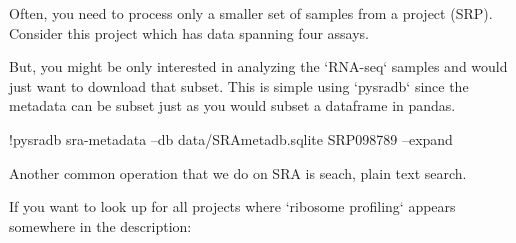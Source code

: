 \documentclass[9pt,a4paper]{extarticle}
\newenvironment{allintypewriter}{\ttfamily}{\par}
\begin{document}
Often, you need to process only a smaller set of samples from a project (SRP).
Consider this project which has data spanning four assays.



But, you might be only interested in analyzing the `RNA-seq` samples and would just want to download that subset.
This is simple using `pysradb` since the metadata can be subset just as you would subset a dataframe in
pandas.




\begin{allintypewriter}
!pysradb sra-metadata --db data/SRAmetadb.sqlite  SRP098789 --expand
\end{allintypewriter}



Another common operation that we do on SRA is seach, plain text search.


If you want to look up for all projects where `ribosome profiling` appears somewhere
in the description:


\begin{comment}

\section*{Discussion} %
This section is only required if the paper includes novel data or analyses, and should be written in the same style as a traditional discussion section.
Please include a brief discussion of allowances made (if any) for controlling bias or unwanted sources of variability, and the limitations of any novel datasets.


\section*{Conclusions} %
This section is only required if the paper includes novel data or analyses, and should be written as a traditional conclusion.

\section*{Summary} %
This section is required if the paper does not include novel data or analyses.  It allows authors to briefly summarize the key points from the article.


\end{comment}
\end{document}
